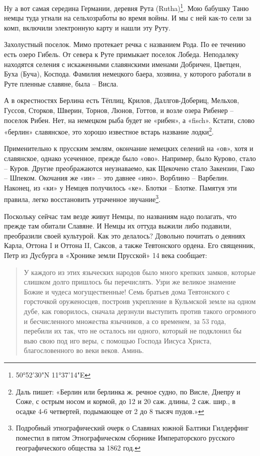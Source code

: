 Ну а вот самая середина Германии, деревня Рута (Rutha)\footnote{50°52'30"N 11°37'14"E}. Мою бабушку Таню немцы туда угнали на сельхозработы во время войны. И мы с ней как-то сели за комп, включили электронную карту и нашли эту Руту.

Захолустный поселок. Мимо протекает речка с названием Рода. По ее течению есть озеро Гибель. От севера к Руте примыкает поселок Лобеда. Неподалеку находятся селения с искаженными славянскими именами Добричен, Цветцен, Буха (Буча), Коспода. Фамилия немецкого баера, хозяина, у которого работали в Руте пленные славяне, была – Висла.

А в окрестностях Берлина есть Тёплиц, Крилов, Далл\-гов-Добериц, Мельхов, Гуссов, Сторков, Шверин, Торнов, Люнов, Готтов, и возле озера Рибенер – поселок Рибен. Нет, на немецком рыба будет не «рибен», а «fisch». Кстати, слово «берлин» славянское, это хорошо известное встарь название лодки\footnote{Даль пишет: «Берлин или берлинка ж. речное судно, по Висле, Днепру и Соже, с острым носом и кормой, до 12 и 20 саж. длины, 2 саж. шир., в осадке 4-6 четвертей, подымающее от 2 до 8 тысяч пудов.»}.

Применительно к прусским землям, окончание немецких селений на «ов», хотя и славянское, однако усеченное, прежде было «ово». Например, было Курово, стало – Куров. Другие преображаются неузнаваемо, как Щекочено стало Закензин, Гако – Шпеком. Окочания же «ин» – это давнее «ино». Ворблино – Варбелин. Наконец, из «ки» у Немцев получилось «ке». Блотки – Блотке. Памятуя эти правила, легко восстановить утраченное звучание\footnote{Подробный этнографический очерк о Славянах южной Балтики Гилдерфинг поместил в пятом Этнографическом сборнике Императорского русского географического общества за 1862 год.}.

Поскольку сейчас там везде живут Немцы, по названиям надо полагать, что прежде там обитали Славяне. И Немцы их оттуда выжили либо подавили, преобразили своей культурой. Как это делалось? Довольно почитать о деяниях Карла, Оттона I и Оттона II, Саксов, а также Тевтонского ордена. Его священник, Петр из Дусбурга в «Хронике земли Прусской» 14 века сообщает\cite{petrdusburg}:

\begin{quotation}
У каждого из этих языческих народов было много крепких замков, которые слишком долго пришлось бы перечислять. Узри же великое знамение Божие и чудеса могущественные! Семь братьев дома Тевтонского с горсточкой оруженосцев, построив укрепление в Кульмской земле на одном дубе, как говорилось, сначала дерзнули выступить против такого огромного и бесчисленного множества язычников, а со временем, за 53 года, перебили их так, что не осталось ни одного, который не подклонил бы выю свою под иго веры, с помощью Господа Иисуса Христа, благословенного во веки веков. Аминь.
\end{quotation}

